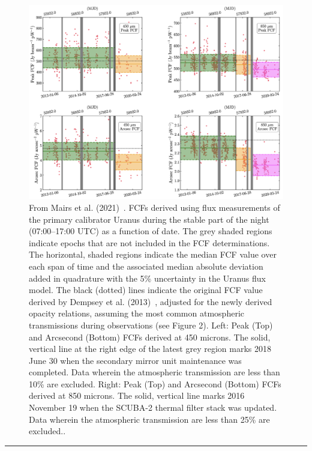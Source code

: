 \begin{center}
\begin{figure}
\includegraphics[width=0.9\linewidth]{sc21_FCFstep}
\caption[FCF step function]{From Mairs et al. (2021)~\cite{mairs21}.
FCFs derived using flux measurements of the primary calibrator Uranus
during the stable part of the night (07:00--17:00 UTC) as a function of
date. The grey shaded regions indicate epochs that are not included in the FCF determinations. The horizontal, shaded regions indicate the median FCF value over each span of time and the associated median absolute deviation added in quadrature with the 5\% uncertainty in the Uranus flux model. The black (dotted) lines indicate the original FCF value derived by Dempsey et al. (2013)~\cite{dempsey12}, adjusted for the newly derived opacity relations, assuming the most common atmospheric transmissions during observations (see Figure 2). Left: Peak (Top) and Arcsecond (Bottom) FCFs derived at 450 microns. The solid, vertical line at the right edge of the latest grey region marks 2018 June 30 when the secondary mirror unit maintenance was completed. Data wherein the atmospheric transmission are less than 10\% are excluded. Right: Peak (Top) and Arcsecond (Bottom) FCFs derived at 850 microns. The solid, vertical line marks 2016 November 19 when the SCUBA-2 thermal filter stack was updated. Data wherein the atmospheric transmission are less than 25\% are excluded..}
\label{fig:FCFstep}
\end{figure}
\end{center}

\rule{1.0\textwidth}{2pt}

